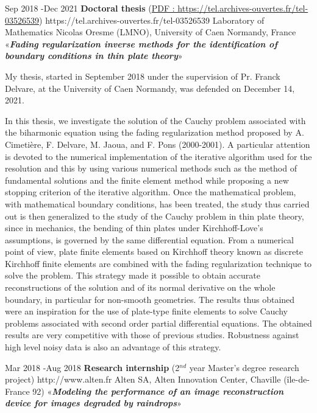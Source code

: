 \documentclass[10pt]{article} %
\begin{document}
\job
{Sep 2018 -}{Dec 2021}
{\textbf{Doctoral thesis} (\href{https://tel.archives-ouvertes.fr/tel-03526539}{PDF : https://tel.archives-ouvertes.fr/tel-03526539})}
{https://tel.archives-ouvertes.fr/tel-03526539}
{Laboratory of Mathematics Nicolas Oresme (LMNO), University of Caen Normandy, France}
{«\textbf{\textit{Fading regularization inverse methods for the identification of boundary conditions in thin plate theory}}»}
{
My thesis, started in September 2018 under the supervision of Pr. Franck Delvare, at the University of Caen Normandy,
was defended on December 14, 2021.

In this thesis, we investigate the solution of the Cauchy problem associated with the biharmonic equation using the fading regularization method proposed by A. Cimetière, F. Delvare, M. Jaoua, and F. Pons (2000-2001). A particular attention is devoted to the numerical implementation of the iterative algorithm used for the resolution and this by using various numerical methods such as the method of fundamental solutions and the finite element method while proposing a new stopping criterion of the iterative algorithm. Once the mathematical problem, with mathematical boundary conditions, has been treated, the study thus carried out is then generalized to the study of the Cauchy problem in thin plate theory, since in mechanics, the bending of thin plates under Kirchhoff-Love’s assumptions, is governed by the same differential equation. From a numerical point of view, plate finite elements based on Kirchhoff theory known as discrete Kirchhoff finite elements are combined with the fading regularization technique to solve the problem. This strategy made it possible to obtain accurate reconstructions of the solution and of its normal derivative on the whole boundary, in particular for non-smooth geometries. The results thus obtained were an inspiration for the use of plate-type finite elements to solve Cauchy problems associated with second order partial differential equations. The obtained results are very competitive with those of previous studies. Robustness against high level noisy data is also an advantage of this strategy.
}



\job
{Mar 2018 -}{Aug 2018}
{\textbf{Research internship} (2$^{nd}$ year Master's degree research project)}
{http://www.alten.fr}
{Alten SA, Alten Innovation Center, Chaville (île-de-France 92)}
{«\textbf{\textit{Modeling the performance of an image reconstruction device for images degraded by raindrops}}»}
\end{document}
